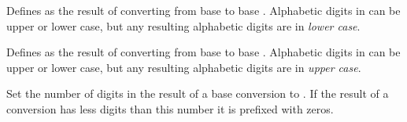 \begin{command}{\pgfmathbasetobase{}}
	Defines  as the result of converting  from
	base  to base . Alphabetic digits in 
	 can be upper or lower case, but any resulting 
	alphabetic digits are in \emph{lower case}.
	
\begin{codeexample}[post=\tt\footnotesize\mynumber]
\pgfmathbasetobase{}
\end{codeexample}

\end{command}

\begin{command}{\pgfmathbasetoBase{}}
	Defines  as the result of converting  from
	base  to base . Alphabetic digits in 
	 can be upper or lower case, but any resulting 
	alphabetic digits are in \emph{upper case}.
	
\begin{codeexample}[post=\tt\footnotesize\mynumber]
\pgfmathbasetoBase{}
\end{codeexample}

\end{command}


\begin{command}{\pgfmathsetbasenumberlength{}}
	Set the number of digits in the result of a base conversion to 
	. If the result of a conversion has less digits
	than this number it is prefixed with zeros.

\begin{codeexample}[post=\tt\footnotesize\mynumber]
\pgfmathdectobase{}
\end{codeexample}

\end{command}